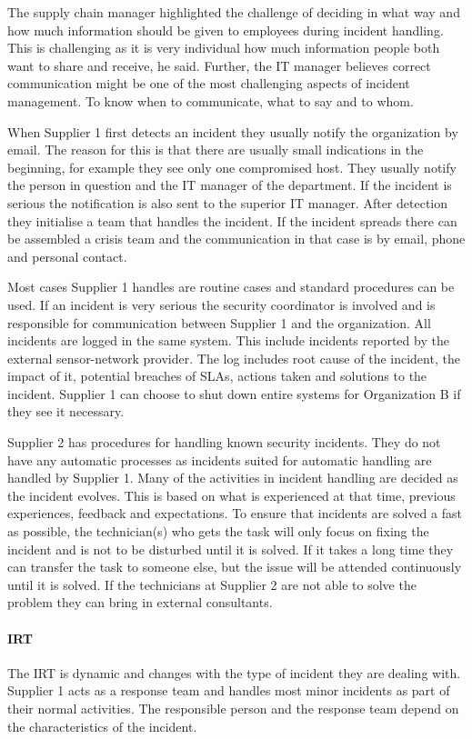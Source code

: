 The supply chain manager highlighted the challenge of deciding in what way and how much information should be given to employees during incident handling. This is challenging as it is very individual how much information people both want to share and receive, he said. Further, the IT manager believes correct communication might be one of the most challenging aspects of incident management. To know when to communicate, what to say and to whom. 

When Supplier 1 first detects an incident they usually notify the organization by email. The reason for this is that there are usually small indications in the beginning, for example they see only one compromised host. They usually notify the person in question and the IT manager of the department. If the incident is serious the notification is also sent to the superior IT manager. After detection they initialise a team that handles the incident. If the incident spreads there can be assembled a crisis team and the communication in that case is by email, phone and personal contact. 

Most cases Supplier 1 handles are routine cases and standard procedures can be used. If an incident is very serious the security coordinator is involved and is responsible for communication between Supplier 1 and the organization. All incidents are logged in the same system. This include incidents reported by the external sensor-network provider. The log includes root cause of the incident, the impact of it, potential breaches of \acp{SLA}, actions taken and solutions to the incident. Supplier 1 can choose to shut down entire systems for Organization B if they see it necessary.

Supplier 2 has procedures for handling known security incidents. They do not have any automatic processes as incidents suited for automatic handling are handled by Supplier 1. Many of the activities in incident handling are decided as the incident evolves. This is based on what is experienced at that time, previous experiences, feedback and expectations. To ensure that incidents are solved a fast as possible, the technician(s) who gets the task will only focus on fixing the incident and is not to be disturbed until it is solved. If it takes a long time they can transfer the task to someone else, but the issue will be attended continuously until it is solved. If the technicians at Supplier 2 are not able to solve the problem they can bring in external consultants.

\paragraph{\acl{IRT}}
The \ac{IRT} is dynamic and changes with the type of incident they are dealing with. Supplier 1 acts as a response team and handles most minor incidents as part of their normal activities. The responsible person and the response team depend on the characteristics of the incident.   

